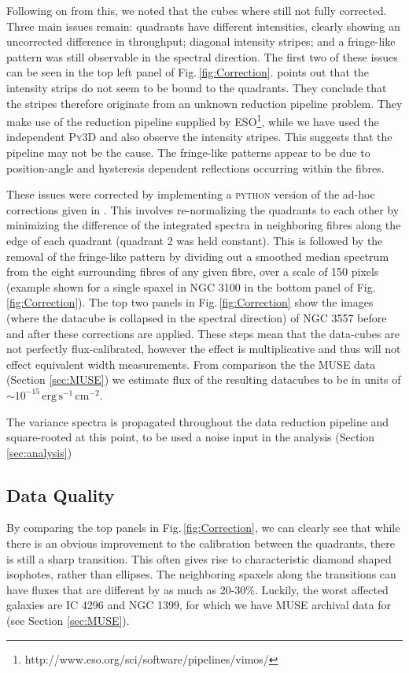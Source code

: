 		Following on from this, we noted that the cubes where still not fully corrected. Three main issues remain: quadrants have different intensities, clearly showing an uncorrected difference in throughput; diagonal intensity stripes; and a fringe-like pattern was still observable in the spectral direction. The first two of these issues can be seen in the top left panel of Fig.\,\ref{fig:Correction}. \citet{Lagerholm2012} points out that the intensity strips do not seem to be bound to the quadrants. They conclude that the stripes therefore originate from an unknown reduction pipeline problem. They make use of the reduction pipeline supplied by ESO\footnote{http://www.eso.org/sci/software/pipelines/vimos/}, while we have used the independent \textsc{Py3D} and also observe the intensity stripes. This suggests that the pipeline may not be the cause. The fringe-like patterns appear to be due to position-angle and hysteresis dependent reflections occurring within the fibres. 

		These issues were corrected by implementing a \textsc{python} version of the ad-hoc corrections given in \citet{Lagerholm2012}. This involves re-normalizing the quadrants to each other by minimizing the difference of the integrated spectra in neighboring fibres along the edge of each quadrant (quadrant 2 was held constant). This is followed by the removal of the fringe-like pattern by dividing out a smoothed median spectrum from the eight surrounding fibres of any given fibre, over a scale of 150 pixels (example shown for a single spaxel in NGC 3100 in the bottom panel of Fig.\,\ref{fig:Correction}). The top two panels in Fig.\,\ref{fig:Correction} show the images (where the datacube is collapsed in the spectral direction) of NGC 3557 before and after these corrections are applied. These steps mean that the data-cubes are not perfectly flux-calibrated, however the effect is multiplicative and thus will not effect equivalent width measurements. From comparison the the MUSE data (Section \ref{sec:MUSE}) we estimate flux of the resulting datacubes to be in units of $\sim 10^{-15} \, \mathrm{erg\,s^{-1}\,cm^{-2}}$. 

		

		The variance spectra is propagated throughout the data reduction pipeline and square-rooted at this point, to be used a noise input in the analysis (Section \ref{sec:analysis})

	\subsection{Data Quality}
		\label{subsec:VIMOSartefacts}
		By comparing the top panels in Fig.\,\ref{fig:Correction}, we can clearly see that while there is an obvious improvement to the calibration between the quadrants, there is still a sharp transition. This often gives rise to characteristic diamond shaped isophotes, rather than ellipses. The neighboring spaxels along the transitions can have fluxes that are different by as much as 20-30\%. Luckily, the worst affected galaxies are IC 4296 and NGC 1399, for which we have MUSE archival data for (see Section \ref{sec:MUSE}). 


